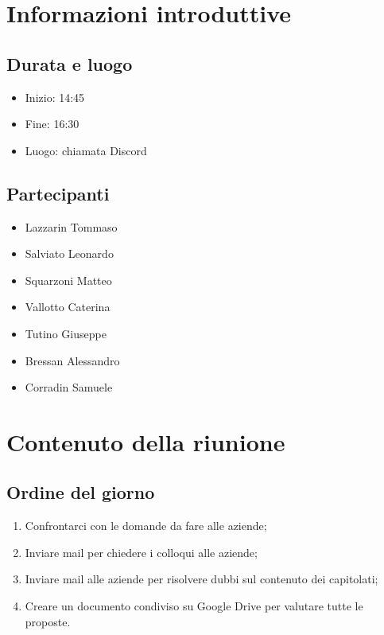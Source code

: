 \documentclass[10pt]{article}
\begin{document}
\newpage
\tableofcontents{\newpage}

\section{Informazioni introduttive}
\subsection{Durata e luogo}
\begin{itemize}
  \item Inizio: 14:45
  \item Fine: 16:30
  \item Luogo: chiamata Discord
\end{itemize}
\subsection{Partecipanti}
\begin{itemize}
    \item Lazzarin Tommaso
    \item Salviato Leonardo
    \item Squarzoni Matteo
    \item Vallotto Caterina
    \item Tutino Giuseppe
    \item Bressan Alessandro
    \item Corradin Samuele
  \end{itemize}
\section{Contenuto della riunione}
\subsection{Ordine del giorno}
\begin{enumerate}
  \item Confrontarci con le domande da fare alle aziende;
  \item Inviare mail per chiedere i colloqui alle aziende;
  \item Inviare mail alle aziende per risolvere dubbi sul contenuto dei capitolati;
  \item Creare un documento condiviso su Google Drive per valutare tutte le proposte.
\end{enumerate}
\end{document}
